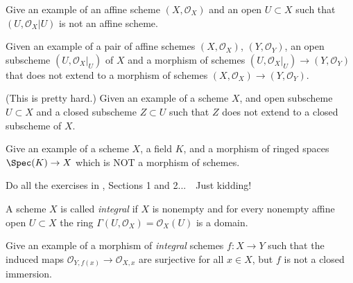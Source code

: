 \begin{exercise}
\label{exercise-open-affine-not-affine}
Give an example of an affine scheme $(X, {\mathcal O}_X)$
and an open $U \subset X$ such that $(U, {\mathcal O}_X|U)$ is not an affine
scheme.
\end{exercise}

\begin{exercise}
\label{exercise-morphism-does-not-extend}
Given an example of a pair of affine schemes
$(X, {\mathcal O}_X)$, $(Y, {\mathcal O}_Y)$,
an open subscheme $(U, {\mathcal O}_X|_U)$
of $X$ and a morphism of schemes
$(U, {\mathcal O}_X|_U) \to (Y, {\mathcal O}_Y)$
that does not extend to a morphism of schemes
$(X, {\mathcal O}_X) \to (Y, {\mathcal O}_Y)$.
\end{exercise}

\begin{exercise}
\label{exercise-closed-subscheme-does-not-extend}
(This is pretty hard.)
Given an example of a scheme $X$, and open subscheme $U \subset X$
and a closed subscheme $Z \subset U$ such that $Z$ does not extend
to a closed subscheme of $X$.
\end{exercise}

\begin{exercise}
\label{exercise-not-morphism-schemes}
Give an example of a scheme $X$, a field $K$, and a
morphism of ringed spaces $\Spec(K) \to X$ which
is NOT a morphism of schemes.
\end{exercise}

\begin{exercise}
\label{exercise-just-kidding}
Do all the exercises in \cite[Chapter II]{H},
Sections 1 and 2...\ \ Just kidding!
\end{exercise}

\begin{definition}
\label{definition-integral}
A scheme $X$ is called {\it integral} if $X$ is nonempty and
for every nonempty affine open $U \subset X$ the ring
$\Gamma(U, \mathcal{O}_X) = \mathcal{O}_X(U)$ is a domain.
\end{definition}

\begin{exercise}
\label{exercise-morphism-integral-schemes-surjective-stalks-not-closed}
Give an example of a morphism of {\it integral}
schemes $f : X \to Y$ such that the induced maps ${\mathcal O}_{Y, f(x)}
\to {\mathcal O}_{X, x}$ are surjective for all $x\in X$, but $f$
is not a closed immersion.
\end{exercise}

